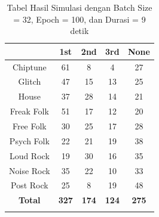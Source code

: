 \begin{longtable}[c]{|c|c|c|c|c|}
	\hline
	\textbf{}      & \textbf{1st} & \textbf{2nd} & \textbf{3rd} & \textbf{None} \\ \hline
	\endfirsthead
	\endhead
	Chiptune       & 61           & 8            & 4            & 27            \\ \hline
	Glitch         & 47           & 15           & 13           & 25            \\ \hline
	House          & 37           & 28           & 14           & 21            \\ \hline
	Freak Folk     & 51           & 17           & 12           & 20            \\ \hline
	Free Folk      & 30           & 25           & 17           & 28            \\ \hline
	Psych Folk     & 22           & 21           & 19           & 38            \\ \hline
	Loud Rock      & 19           & 30           & 16           & 35            \\ \hline
	Noise Rock     & 35           & 22           & 10           & 33            \\ \hline
	Post Rock      & 25           & 8            & 19           & 48            \\ \hline
	\textbf{Total} & \textbf{327} & \textbf{174} & \textbf{124} & \textbf{275}  \\ \hline
	\caption{Tabel Hasil Simulasi dengan Batch Size = 32, Epoch = 100, dan Durasi = 9 detik}
	\label{tab:my-table}\\
\end{longtable}

